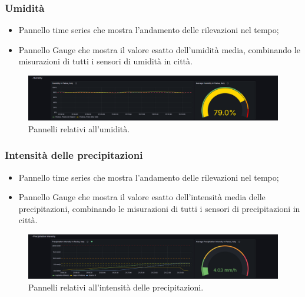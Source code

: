 \documentclass[8pt]{article}
\begin{document}
\subsubsection{Umidità}
\begin{itemize}
\setlength\itemsep{0em}
    \item Pannello time series che mostra l'andamento delle rilevazioni nel tempo;
    \item Pannello Gauge che mostra il valore esatto dell'umidità media, combinando le misurazioni di tutti i sensori di umidità in città.
\end{itemize}
\begin{figure}[H]
    \centering
    \includegraphics[width=15cm]{images_mu/humidity.png}
    \caption{Pannelli relativi all'umidità.}
    \label{fig:Pannelli relativi all'umidità}
\end{figure}
\subsubsection{Intensità delle precipitazioni}
\begin{itemize}
\setlength\itemsep{0em}
    \item Pannello time series che mostra l'andamento delle rilevazioni nel tempo;
    \item Pannello Gauge che mostra il valore esatto dell'intensità media delle precipitazioni, combinando le misurazioni di tutti i sensori di precipitazioni in città.
\end{itemize}
\begin{figure}[H]
    \centering
    \includegraphics[width=15cm]{images_mu/precipitation_intensity.png}
    \caption{Pannelli relativi all'intensità delle precipitazioni.}
    \label{fig:Pannelli relativi all'intensità delle precipitazioni}
\end{figure}
\end{document}
